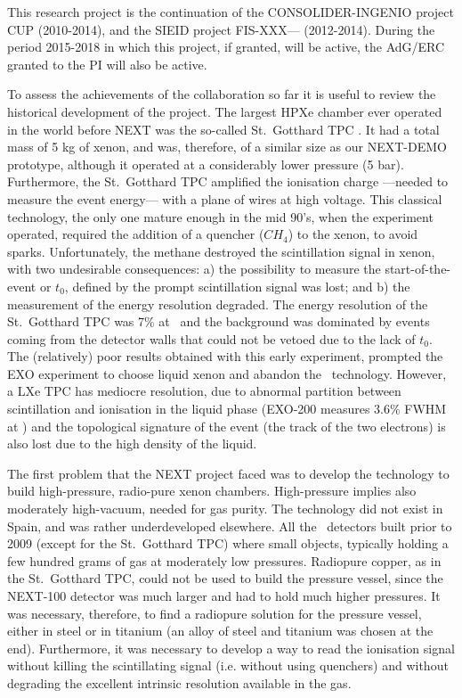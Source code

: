 
This research project is the continuation of the CONSOLIDER-INGENIO project CUP (2010-2014), and the SIEID project FIS-XXX--- (2012-2014). During the period 2015-2018 in which this project, if granted, will be active, the AdG/ERC granted to the PI will also be active.

To assess the achievements of the collaboration so far it is useful to review the historical development of the project. 
The largest HPXe chamber ever operated in the world before NEXT was the so-called St.~Gotthard TPC \cite{Luscher:1998sd}. It had a total mass of 5 kg of xenon, and was, therefore, of a similar size as our NEXT-DEMO prototype, although it operated at a considerably lower pressure (5 bar). Furthermore, the St.~Gotthard TPC amplified the ionisation charge ---needed to measure the event energy--- with a plane of wires at high voltage. This classical technology, the only one mature enough in the mid 90's, when the experiment operated, required the addition of a quencher ($CH_4$) to the xenon, to avoid sparks. Unfortunately, the methane destroyed the scintillation signal in xenon, with two undesirable consequences: a) the possibility to measure the start-of-the-event or $t_0$, defined by the prompt scintillation signal was lost; and b) the measurement of the energy resolution degraded. The energy resolution of the St.~Gotthard TPC was 7\% at \Qbb\ and the background was dominated by events coming from the detector walls that could not be vetoed due to the lack of $t_0$. The (relatively) poor results obtained with this early experiment, prompted the EXO experiment to choose liquid xenon and abandon the \HPXE\ technology. However, a LXe TPC has mediocre resolution, due to abnormal partition between scintillation and ionisation in the liquid phase (EXO-200 measures 3.6\% FWHM at \Qbb) and the topological signature of the event (the track of the two electrons) is also lost due to the high density of the liquid. 

The first problem that the NEXT project faced was to develop the technology to build high-pressure, radio-pure xenon chambers. High-pressure implies also moderately high-vacuum, needed for gas purity. The technology did not exist in Spain, and was rather underdeveloped elsewhere. All the \HPXE\ detectors built prior to 2009 (except for the St.~Gotthard TPC) where small objects, typically holding a few hundred grams of gas at moderately low pressures. Radiopure copper, as in the St.~Gotthard TPC, could not be used to build the pressure vessel, since the NEXT-100 detector was much larger and had to hold much higher pressures.  It was necessary, therefore, to find a radiopure solution for the pressure vessel, either in steel or in titanium (an alloy of steel and titanium was chosen at the end). Furthermore, it was necessary to develop a way to read the ionisation signal without killing the scintillating signal (i.e. without using quenchers) and without degrading the excellent intrinsic resolution available in the gas. 

